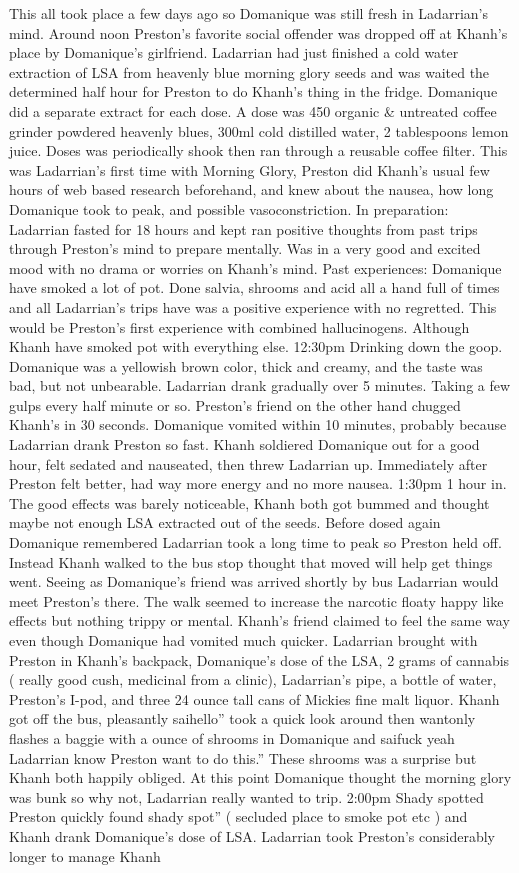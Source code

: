 \documentclass[12pt]{book}
\begin{document}
This all took place a few days ago so Domanique was still fresh in Ladarrian's mind. Around noon Preston's favorite social offender was dropped off at Khanh's place by Domanique's girlfriend. Ladarrian had just finished a cold water extraction of LSA from heavenly blue morning glory seeds and was waited the determined half hour for Preston to do Khanh's thing in the fridge. Domanique did a separate extract for each dose. A dose was 450 organic \& untreated coffee grinder powdered heavenly blues, 300ml cold distilled water, 2 tablespoons lemon juice. Doses was periodically shook then ran through a reusable coffee filter. This was Ladarrian's first time with Morning Glory, Preston did Khanh's usual few hours of web based research beforehand, and knew about the nausea, how long Domanique took to peak, and possible vasoconstriction. In preparation: Ladarrian fasted for 18 hours and kept ran positive thoughts from past trips through Preston's mind to prepare mentally. Was in a very good and excited mood with no drama or worries on Khanh's mind. Past experiences: Domanique have smoked a lot of pot. Done salvia, shrooms and acid all a hand full of times and all Ladarrian's trips have was a positive experience with no regretted. This would be Preston's first experience with combined hallucinogens. Although Khanh have smoked pot with everything else. 12:30pm Drinking down the goop. Domanique was a yellowish brown color, thick and creamy, and the taste was bad, but not unbearable. Ladarrian drank gradually over 5 minutes. Taking a few gulps every half minute or so. Preston's friend on the other hand chugged Khanh's in 30 seconds. Domanique vomited within 10 minutes, probably because Ladarrian drank Preston so fast. Khanh soldiered Domanique out for a good hour, felt sedated and nauseated, then threw Ladarrian up. Immediately after Preston felt better, had way more energy and no more nausea. 1:30pm 1 hour in. The good effects was barely noticeable, Khanh both got bummed and thought maybe not enough LSA extracted out of the seeds. Before dosed again Domanique remembered Ladarrian took a long time to peak so Preston held off. Instead Khanh walked to the bus stop thought that moved will help get things went. Seeing as Domanique's friend was arrived shortly by bus Ladarrian would meet Preston's there. The walk seemed to increase the narcotic floaty happy like effects but nothing trippy or mental. Khanh's friend claimed to feel the same way even though Domanique had vomited much quicker. Ladarrian brought with Preston in Khanh's backpack, Domanique's dose of the LSA, 2 grams of cannabis ( really good cush, medicinal from a clinic), Ladarrian's pipe, a bottle of water, Preston's I-pod, and three 24 ounce tall cans of Mickies fine malt liquor. Khanh got off the bus, pleasantly saihello'' took a quick look around then wantonly flashes a baggie with a  ounce of shrooms in Domanique and saifuck yeah Ladarrian know Preston want to do this.'' These shrooms was a surprise but Khanh both happily obliged. At this point Domanique thought the morning glory was bunk so why not, Ladarrian really wanted to trip. 2:00pm Shady spotted Preston quickly found shady spot'' ( secluded place to smoke pot etc ) and Khanh drank Domanique's dose of LSA. Ladarrian took Preston's considerably longer to manage Khanh 
\end{document}
